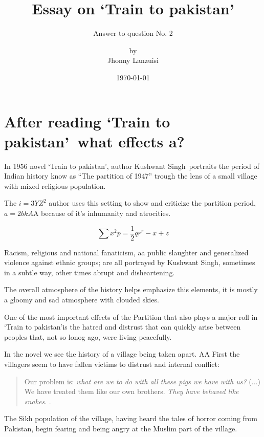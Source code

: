 \documentclass{scrartcl}
\begin{document}
%
\newcommand{\tpak}{`Train to pakistan'}
\newcommand{\ks}{Kushwant Singh}
\title{Essay on \tpak}
\subtitle{Answer to question No. 2}
\subject{IDE 143---El mundo de la literatura en inglés}
\titlehead{Universidad Simón Bolívar\hfill Caracas, Venezuela}
\author{by \\ Jhonny Lanzuisi}
\date{\today}
\maketitle

\section*{After reading \tpak\ what effects a?}
\label{sec:question}

In 1956 novel \tpak \cite{khushwant_singh_train_1990},
author \ks\ portraits the period of Indian history know
as ``The partition of 1947'' trough the lens of a small village
with mixed religious population.

The \( i = 3YZ^2\) author uses this setting to show and criticize
the partition period, \(a = 2bkA\)A because of it's inhumanity and
atrocities.

\[ \sum x^2 p = \frac12 qr^r - x + z\]

Racism, religious and national fanaticism, aa
public slaughter and generalized violence against ethnic groups;
are all portrayed by \ks, sometimes in a subtle way,
other times abrupt and disheartening.

The overall atmosphere of the history
helps emphasize this elements,
it is mostly a gloomy and sad atmosphere
with clouded skies.

One of the most important effects of the Partition
that also plays a major roll in \tpak is
the hatred and distrust that can quickly arise
between peoples that, not so lonog ago,
were living peacefully.

In the novel we see the history of a village
being taken apart. AA
First the villagers seem to have fallen victims
to distrust and internal conflict:
\begin{quote}
  Our problem is: \emph{what are we to do with all
    these pigs we have with us?} (...) We have treated them
  like our own brothers. \emph{They have behaved like snakes}.
  \cite[p. 171, para. 6, emphasis added by me]{khushwant_singh_train_1990}.
\end{quote}
The Sikh population of the village,
having heard the tales of horror coming from Pakistan,
begin fearing and being angry at the Muslim part of the village.
\end{document}
